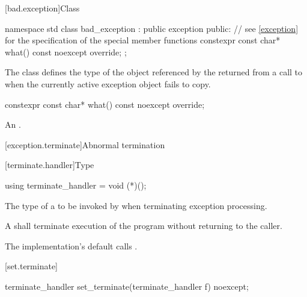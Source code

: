 [bad.exception]{Class }

%
%
\begin{codeblock}
namespace std {
  class bad_exception : public exception {
  public:
    // see \ref{exception} for the specification of the special member functions
    constexpr const char* what() const noexcept override;
  };
}
\end{codeblock}

\pnum
The class
defines the type of the object
referenced by the 
returned from a call to 
when the currently active exception object fails to copy.

%
\begin{itemdecl}
constexpr const char* what() const noexcept override;
\end{itemdecl}

\begin{itemdescr}
\pnum
\returns
An  \ntbs{}.
\end{itemdescr}

[exception.terminate]{Abnormal termination}

[terminate.handler]{Type }

%
\begin{itemdecl}
using terminate_handler = void (*)();
\end{itemdecl}

\begin{itemdescr}
\pnum
The type of a 
to be invoked by 
%
when terminating exception processing.

\pnum
\required
A  shall
terminate execution of the program without returning to the caller.

\pnum
{}
The implementation's default  calls
.%
%
\end{itemdescr}

[set.terminate]{}

%
\begin{itemdecl}
terminate_handler set_terminate(terminate_handler f) noexcept;
\end{itemdecl}

